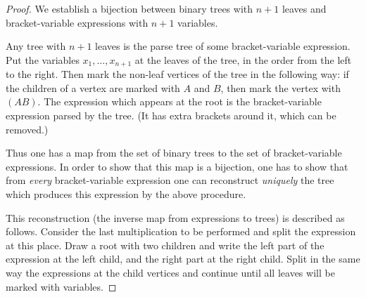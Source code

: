 \begin{proof}
We establish a bijection between binary trees with $n+1$ leaves and bracket-variable expressions with $n+1$ variables.

Any tree with $n+1$ leaves is the parse tree of some bracket-variable expression.
Put the variables $x_1, \ldots, x_{n+1}$ at the leaves of the tree, in the order from the left to the right.
Then mark the non-leaf vertices of the tree in the following way:
if the children of a vertex are marked with $A$ and $B$, then mark the vertex with $(AB)$.
The expression which appears at the root is the bracket-variable expression parsed by the tree.
(It has extra brackets around it, which can be removed.)

Thus one has a map from the set of binary trees to the set of bracket-variable expressions.
In order to show that this map is a bijection, one has to show that from \emph{every} bracket-variable expression
one can reconstruct \emph{uniquely} the tree which produces this expression by the above procedure.

This reconstruction (the inverse map from expressions to trees) is described as follows.
Consider the last multiplication to be performed and split the expression at this place.
Draw a root with two children and write the left part of the expression at the left child, and the right part at the right child.
Split in the same way the expressions at the child vertices and continue until all leaves will be marked with variables.
\end{proof}


